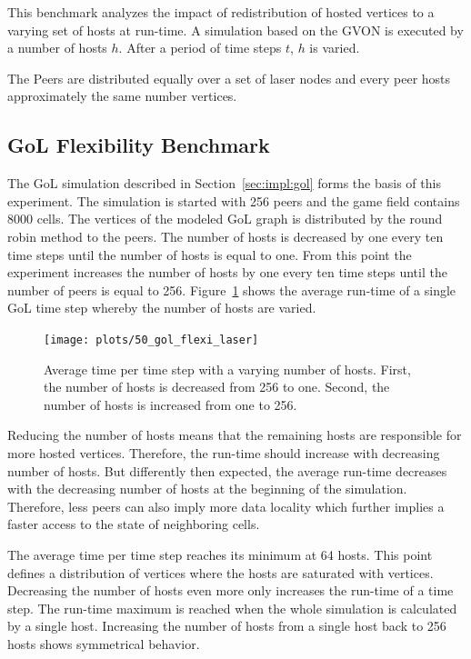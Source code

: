 This benchmark analyzes the impact of redistribution of hosted
vertices to a varying set of hosts at run-time. A simulation based on the
GVON is executed by a number of hosts $h$. After a period of time steps
$t$, $h$ is varied.

The Peers are distributed equally over a set of laser nodes and
every peer hosts approximately the same number vertices.

\subsection{GoL Flexibility Benchmark}

The GoL simulation described in Section~\ref{sec:impl:gol} forms the
basis of this experiment.  The simulation is started with 256 peers
and the game field contains 8000 cells. The vertices of the modeled
GoL graph is distributed by the round robin method to the peers.  The
number of hosts is decreased by one every ten time steps until the
number of hosts is equal to one. From this point the experiment
increases the number of hosts by one every ten time steps until the
number of peers is equal to 256. Figure~\ref{fig:gol_flexi_laser}
shows the average run-time of a single GoL time step whereby the
number of hosts are varied.

\begin{figure}[H]
  \texttt{[image: plots/50\_gol\_flexi\_laser]}
  \caption{Average time per time step with a varying number of
    hosts. First, the number of hosts is decreased from 256 to
    one. Second, the number of hosts is increased from one to 256.}
  \label{fig:gol_flexi_laser}
\end{figure}

\noindent Reducing the number of hosts means that the remaining hosts are
responsible for more hosted vertices. Therefore, the run-time should increase
with decreasing number of hosts.  But differently then expected, the
average run-time decreases with the decreasing number of hosts at the
beginning of the simulation. Therefore, less peers can also imply more
data locality which further implies a faster access to the state of
neighboring cells.

The average time per time step reaches its minimum at 64 hosts. This
point defines a distribution of vertices where the hosts are saturated
with vertices.  Decreasing the number of hosts even more only
increases the run-time of a time step. The run-time maximum is reached
when the whole simulation is calculated by a single host.  Increasing
the number of hosts from a single host back to 256 hosts shows
symmetrical behavior.




\cleardoublepage

